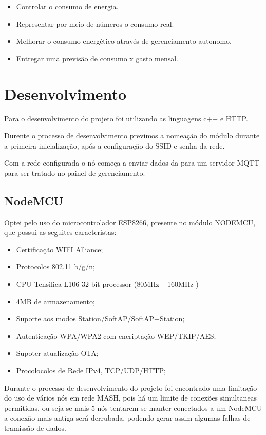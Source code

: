 \documentclass[openright]{normas-utf-tex} %
\begin{document}
\begin{itemize}
	\item Controlar o consumo de energia.
	\item Representar por meio de números o consumo real. 
	\item Melhorar o consumo energético através de gerenciamento autonomo.
	\item Entregar uma previsão de consumo x gasto mensal.
\end{itemize}


\chapter{Desenvolvimento}
\label{chap:desenv}

 
Para o desenvolvimento do projeto foi utilizando as  linguagens c++   \cite{Altabooks} e HTTP.

Durente o processo de desenvolvimento previmos a nomeação do módulo durante a primeira inicialização, após a configuração do SSID e senha da rede.

Com a rede configurada o nó começa a enviar dados da para um servidor MQTT   \cite{Novatec} para ser tratado no painel de gerenciamento. 

\section{NodeMCU}
Optei pelo uso do microcontrolador ESP8266, presente no módulo NODEMCU, que possui as seguites caracteristas:
\begin{itemize}
    \item Certificação WIFI Alliance;  \cite{espressif}
    \item Protocolos 802.11 b/g/n;\cite{espressif}
    \item CPU Tensilica L106 32-bit processor (80MHz ~ 160MHz )  \cite{Novatec}
    \item 4MB de armazenamento;
    \item Suporte aos modos Station/SoftAP/SoftAP+Station;\cite{espressif}
    \item Autenticação WPA/WPA2 com encriptação WEP/TKIP/AES;\cite{espressif}
    \item Supoter atualização OTA;\cite{espressif}
    \item Procolocolos de Rede IPv4, TCP/UDP/HTTP;\cite{espressif}
\end{itemize}

Durante o processo de desenvolvimento do projeto foi encontrado uma limitação do uso de vários nós em rede MASH, pois há um limite de conexões simultaneas permitidas, ou seja se mais 5 nós tentarem se manter conectados a um NodeMCU a conexão mais antiga será derrubada, podendo gerar assim algumas falhas de tramissão de dados. 
\end{document}
